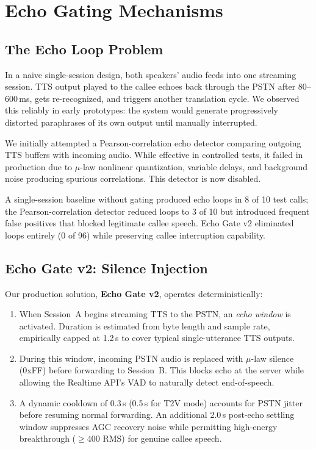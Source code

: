 \documentclass[11pt]{article}
\begin{document}
\section{Echo Gating Mechanisms}

\subsection{The Echo Loop Problem}

In a naive single-session design, both speakers' audio feeds into one streaming session. TTS output played to the callee echoes back through the PSTN after 80--600\,ms, gets re-recognized, and triggers another translation cycle. We observed this reliably in early prototypes: the system would generate progressively distorted paraphrases of its own output until manually interrupted.

We initially attempted a Pearson-correlation echo detector comparing outgoing TTS buffers with incoming audio. While effective in controlled tests, it failed in production due to $\mu$-law nonlinear quantization, variable delays, and background noise producing spurious correlations. This detector is now disabled.

A single-session baseline without gating produced echo loops in 8 of 10 test calls; the Pearson-correlation detector reduced loops to 3 of 10 but introduced frequent false positives that blocked legitimate callee speech. Echo Gate v2 eliminated loops entirely (0 of 96) while preserving callee interruption capability.

\subsection{Echo Gate v2: Silence Injection}

Our production solution, \textbf{Echo Gate v2}, operates deterministically:

\begin{enumerate}
    \item When Session~A begins streaming TTS to the PSTN, an \emph{echo window} is activated. Duration is estimated from byte length and sample rate, empirically capped at 1.2\,s to cover typical single-utterance TTS outputs.
    \item During this window, incoming PSTN audio is replaced with $\mu$-law silence (0xFF) before forwarding to Session~B. This blocks echo at the server while allowing the Realtime API's VAD to naturally detect end-of-speech.
    \item A dynamic cooldown of 0.3\,s (0.5\,s for T2V mode) accounts for PSTN jitter before resuming normal forwarding. An additional 2.0\,s post-echo settling window suppresses AGC recovery noise while permitting high-energy breakthrough ($\geq$400 RMS) for genuine callee speech.
\end{enumerate}
\end{document}
